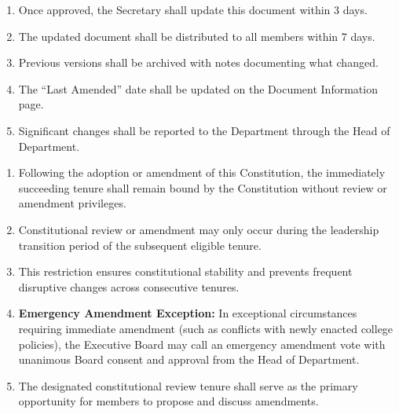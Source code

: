 
\begin{enumerate}[label=\alph*), leftmargin=2em, itemsep=0.3em]
    \item Once approved, the Secretary shall update this document within 3 days.
    
    \item The updated document shall be distributed to all members within 7 days.
    
    \item Previous versions shall be archived with notes documenting what changed.
    
    \item The ``Last Amended'' date shall be updated on the Document Information page.
    
    \item Significant changes shall be reported to the Department through the Head of Department.
\end{enumerate}


\begin{enumerate}[label=\alph*), leftmargin=2em, itemsep=0.3em]
    \item Following the adoption or amendment of this Constitution, the immediately succeeding tenure shall remain bound by the Constitution without review or amendment privileges.
    
    \item Constitutional review or amendment may only occur during the leadership transition period of the subsequent eligible tenure.
    
    \item This restriction ensures constitutional stability and prevents frequent disruptive changes across consecutive tenures.
    
    \item \textbf{Emergency Amendment Exception:} In exceptional circumstances requiring immediate amendment (such as conflicts with newly enacted college policies), the Executive Board may call an emergency amendment vote with unanimous Board consent and approval from the Head of Department.
    
    \item The designated constitutional review tenure shall serve as the primary opportunity for members to propose and discuss amendments.
\end{enumerate}

